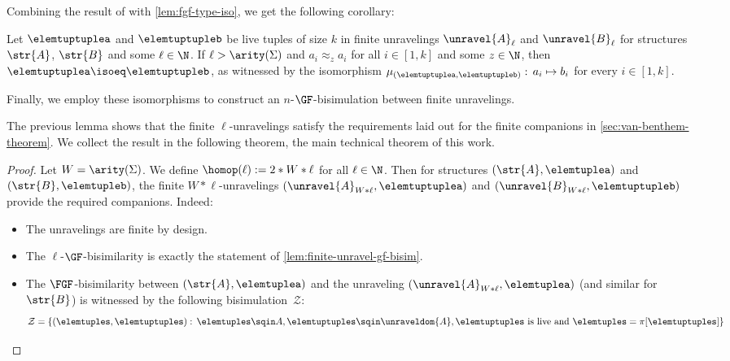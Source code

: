 Combining the result of with \cref{lem:fgf-type-iso}, we get the following corollary:
\begin{corollary}\label{cor:tuple-similar-iso}
  Let $\elemtuptuplea$ and $\elemtuptupleb$ be live tuples of size $k$ in finite unravelings $\unravel{A}_{\ell}$ and $\unravel{B}_{\ell}$ for structures $\str{A}$, $\str{B}$ and some $\ell \in \N$.
  If $\ell > \arity(\Sigma)$ and $a_{i} \approx_{z} a_{i}$ for all $i \in [1,k]$ and some $z \in \N$, then $\elemtuptuplea \isoeq \elemtuptupleb$, as witnessed by the isomorphism $\mu_{(\elemtuptuplea, \elemtuptupleb)}:\, a_{i} \mapsto b_{i}$ for every $i \in [1, k]$.
\end{corollary}
Finally, we employ these isomorphisms to construct an $n$-$\GF$-bisimulation between finite unravelings.


The previous lemma shows that the finite $\ell$-unravelings satisfy the requirements laid out for the finite companions in \cref{sec:van-benthem-theorem}.
We collect the result in the following theorem, the main technical theorem of this work.
\maintechnicalthm
\begin{proof}
  Let $W = \arity(\Sigma)$. We define $\homop(\ell) := 2 * W * \ell$ for all $\ell \in \N$.
  Then for structures $(\str{A}, \elemtuplea)$ and $(\str{B}, \elemtupleb)$, the finite $W * \ell$-unravelings $(\unravel{A}_{W * \ell}, \elemtuptuplea)$ and $(\unravel{B}_{W * \ell}, \elemtuptupleb)$ provide the required companions.
  Indeed:
  \begin{itemize}
    \item The unravelings are finite by design.
    \item The $\ell$-$\GF$-bisimilarity is exactly the statement of \cref{lem:finite-unravel-gf-bisim}.
    \item The $\FGF$-bisimilarity between $(\str{A}, \elemtuplea)$ and the unraveling $(\unravel{A}_{W * \ell}, \elemtuplea)$ (and similar for $\str{B}$) is witnessed by the following bisimulation~$\mathcal{Z}$:
          \begin{equation*}
            \mathcal{Z} = \{ (\elemtuples, \elemtuptuples):\, \elemtuples \sqin A, \elemtuptuples \sqin \unraveldom{A}, \elemtuptuples \text{ is live and } \elemtuples = \pi[\elemtuptuples] \}
          \end{equation*}
  \end{itemize}
\end{proof}
